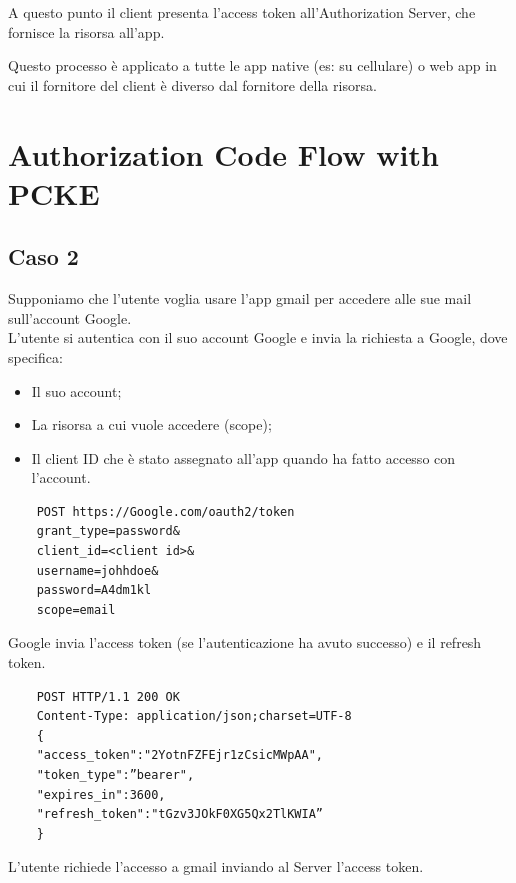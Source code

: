 \noindent A questo punto il client presenta l'access token all'Authorization Server, che fornisce la risorsa all'app.

Questo processo è applicato a tutte le app native (es: su cellulare) o web app in cui il fornitore del client è diverso dal fornitore della risorsa.

\section{Authorization Code Flow with PCKE}












\subsection{Caso 2}
Supponiamo che l'utente voglia usare l'app gmail per accedere alle sue mail sull'account Google.
\\

\noindent L'utente si autentica con il suo account Google e invia la richiesta a Google, dove specifica:
\begin{itemize}
    \item Il suo account;
    \item La risorsa a cui vuole accedere (scope);
    \item Il client ID che è stato assegnato all'app quando ha fatto accesso con l'account.
\end{itemize}

\begin{lstlisting}
    POST https://Google.com/oauth2/token  
    grant_type=password&  
    client_id=<client id>&  
    username=johhdoe&  
    password=A4dm1kl  
    scope=email
\end{lstlisting}

\noindent Google invia l'access token (se l'autenticazione ha avuto successo) e il refresh token.

\begin{lstlisting}
    POST HTTP/1.1 200 OK  
    Content-Type: application/json;charset=UTF-8  
    {  
    "access_token":"2YotnFZFEjr1zCsicMWpAA",  
    "token_type":”bearer",  
    "expires_in":3600,  
    "refresh_token":"tGzv3JOkF0XG5Qx2TlKWIA”  
    }
\end{lstlisting}

\noindent L'utente richiede l'accesso a gmail inviando al Server l'access token.

